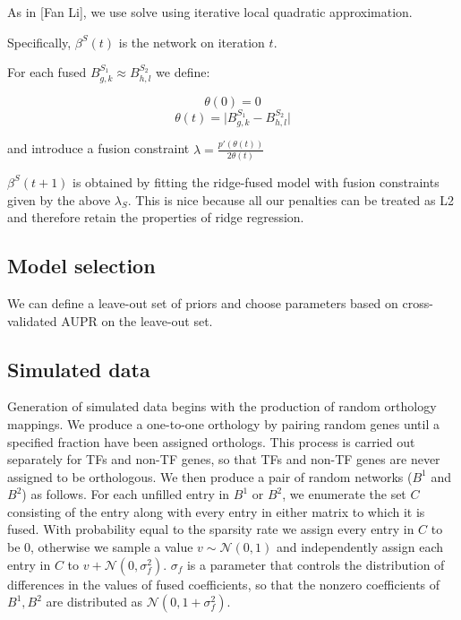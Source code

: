 \documentclass[11pt]{article}
\begin{document}
As in [Fan Li], we use solve using iterative local quadratic approximation. 

Specifically, $\beta^S(t)$ is the network on iteration $t$. 

For each fused $B^{S_1}_{g,k} \approx B^{S_2}_{h,l}$ we define:

\begin{equation} 
\theta(0)=0
\end{equation}
\begin{equation}
\theta(t) = \vert B^{S_1}_{g,k} - B^{S_2}_{h,l} \vert
\end{equation}

and introduce a fusion constraint $\lambda = \frac{p'(\theta(t))}{2\theta(t)} $

$\beta^S(t+1)$ is obtained by fitting the ridge-fused model with fusion constraints given by the above $\lambda_S$. This is nice because all our penalties can be treated as L2 and therefore retain the properties of ridge regression. 

\subsection{Model selection}
We can define a leave-out set of priors and choose parameters based on cross-validated AUPR on the leave-out set. 

\subsection{Simulated data}
Generation of simulated data begins with the production of random orthology mappings. We produce a one-to-one orthology by pairing random genes until a specified fraction have been assigned orthologs. This process is carried out separately for TFs and non-TF genes, so that TFs and non-TF genes are never assigned to be orthologous. We then produce a pair of random networks ($B^1$ and $B^2$) as follows. For each unfilled entry in $B^1$ or $B^2$, we enumerate the set $C$ consisting of the entry along with every entry in either matrix to which it is fused. With probability equal to the sparsity rate we assign every entry in $C$ to be 0, otherwise we sample a value $v \sim \mathcal{N}(0,1)$ and independently assign each entry in $C$ to $v + \mathcal{N}(0, \sigma_f^2)$. $\sigma_f$ is a parameter that controls the distribution of differences in the values of fused coefficients, so that the nonzero coefficients of $B^1, B^2$ are distributed as $\mathcal{N}(0, 1 + \sigma_f^2)$.
\end{document}
